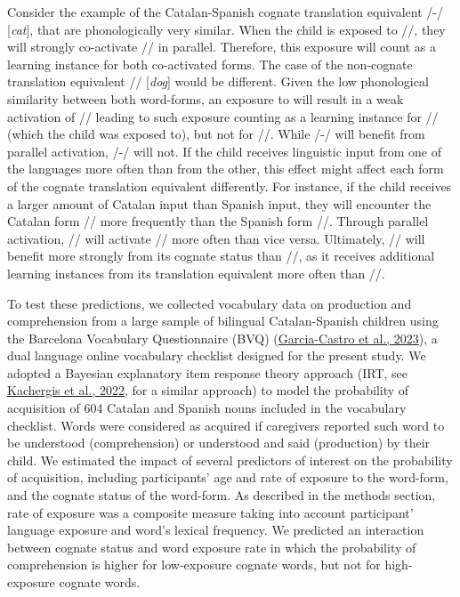 \documentclass[
]{article}
\begin{document}
Consider the example of the Catalan-Spanish cognate translation
equivalent /-/ {[}\emph{cat}{]}, that are
phonologically very similar. When the child is exposed to
//, they will strongly co-activate // in
parallel. Therefore, this exposure will count as a learning instance for
both co-activated forms. The case of the non-cognate translation
equivalent // {[}\emph{dog}{]} would be different.
Given the low phonological similarity between both word-forms, an
exposure to  will result in a weak activation of
// leading to such exposure counting as a learning
instance for // (which the child was exposed to), but not
for //. While /-/ will
benefit from parallel activation, /-/ will
not. If the child receives linguistic input from one of the languages
more often than from the other, this effect might affect each form of
the cognate translation equivalent differently. For instance, if the
child receives a larger amount of Catalan input than Spanish input, they
will encounter the Catalan form // more frequently than
the Spanish form //. Through parallel activation,
// will activate // more often than vice
versa. Ultimately, // will benefit more strongly from
its cognate status than //, as it receives additional
learning instances from its translation equivalent more often than
//.

To test these predictions, we collected vocabulary data on production
and comprehension from a large sample of bilingual Catalan-Spanish
children using the Barcelona Vocabulary Questionnaire (BVQ)
(\protect\hyperlink{ref-garcia-castro2023bvq}{Garcia-Castro et al.,
2023}), a dual language online vocabulary checklist designed for the
present study. We adopted a Bayesian explanatory item response theory
approach (IRT, see
\protect\hyperlink{ref-kachergis2022standard}{Kachergis et al., 2022},
for a similar approach) to model the probability of acquisition of 604
Catalan and Spanish nouns included in the vocabulary checklist. Words
were considered as acquired if caregivers reported such word to be
understood (comprehension) or understood and said (production) by their
child. We estimated the impact of several predictors of interest on the
probability of acquisition, including participants' age and rate of
exposure to the word-form, and the cognate status of the word-form. As
described in the methods section, rate of exposure was a composite
measure taking into account participant' language exposure and word's
lexical frequency. We predicted an interaction between cognate status
and word exposure rate in which the probability of comprehension is
higher for low-exposure cognate words, but not for high-exposure cognate
words.
\end{document}
